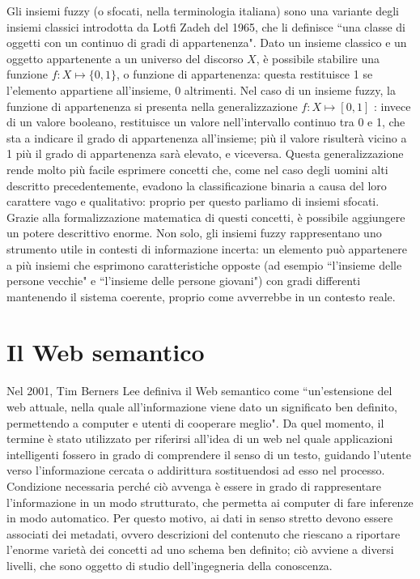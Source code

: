 \documentclass[12pt,a4paper]{report}
\begin{document}
Gli insiemi fuzzy (o sfocati, nella terminologia italiana) sono una variante degli insiemi classici introdotta da Lotfi Zadeh del 1965, che li definisce ``una classe di oggetti con un continuo di gradi di appartenenza"\cite{fuzzysetspaper}.
Dato un insieme classico e un oggetto appartenente a un universo del discorso $X$, è possibile stabilire una funzione  $f: X \mapsto \{0,1\}$, o funzione di appartenenza: questa restituisce 1 se l'elemento appartiene all'insieme, 0 altrimenti.
Nel caso di un insieme fuzzy, la funzione di appartenenza si presenta nella generalizzazione  $f: X \mapsto [0,1]$ : invece di un valore booleano, restituisce un valore nell'intervallo continuo tra 0 e 1, che sta a indicare il grado di appartenenza all'insieme; più il valore risulterà vicino a 1 più il grado di appartenenza sarà elevato, e viceversa.
Questa generalizzazione rende molto più facile esprimere concetti che, come nel caso degli uomini alti descritto precedentemente, evadono la classificazione binaria a causa del loro carattere vago e qualitativo: proprio per questo parliamo di insiemi sfocati. Grazie alla formalizzazione matematica di questi concetti, è possibile aggiungere un potere descrittivo enorme. Non solo, gli insiemi fuzzy rappresentano uno strumento utile in contesti di informazione incerta: un elemento può appartenere a più insiemi che esprimono caratteristiche opposte (ad esempio ``l'insieme delle persone vecchie" e ``l'insieme delle persone giovani"\cite{fuzzysystemspaper}) con gradi differenti mantenendo il sistema coerente, proprio come avverrebbe in un contesto reale.


\section{Il Web semantico}
Nel 2001, Tim Berners Lee definiva il Web semantico come ``un'estensione del web attuale, nella quale all'informazione viene dato un significato ben definito, permettendo a computer e utenti di cooperare meglio"\cite{semanticWebPaper}.
Da quel momento, il termine è stato utilizzato per riferirsi all'idea di un web nel quale applicazioni intelligenti fossero in grado di comprendere il senso di un testo, guidando l'utente verso l'informazione cercata o addirittura sostituendosi ad esso nel processo.
Condizione necessaria perché ciò avvenga è essere in grado di rappresentare l'informazione in un modo strutturato, che permetta ai computer di fare inferenze in modo automatico. Per questo motivo, ai dati in senso stretto devono essere associati dei metadati, ovvero descrizioni del contenuto che riescano a riportare l'enorme varietà dei concetti ad uno schema ben definito; ciò avviene a diversi livelli, che sono oggetto di studio dell'ingegneria della conoscenza. 
\end{document}
